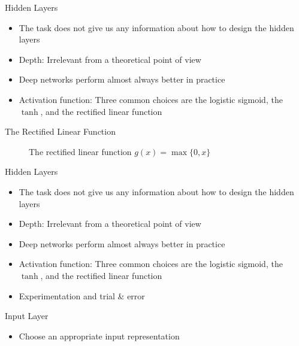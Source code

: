 \documentclass{beamer}
\begin{document}
	\begin{frame}{Hidden Layers}
		\begin{itemize}
			\item <1-> The task does not give us any information about how to design the hidden layers
			\item <2-> Depth: Irrelevant from a theoretical point of view
			\item <3-> Deep networks perform almost always better in practice
			\item <4-> Activation function: Three common choices are the logistic sigmoid, the $\tanh$, and the rectified linear function
		\end{itemize}
	\end{frame}
	\begin{frame}{The Rectified Linear Function}
		\begin{figure}
			\begin{center}
				
			\end{center}
			\caption{The rectified linear function $g(x) = \max\{0,x\}$}
			\label{fig:sigmoid}
		\end{figure}
	\end{frame}
	\begin{frame}{Hidden Layers}
		\begin{itemize}
			\item <1-> The task does not give us any information about how to design the hidden layers
			\item <1-> Depth: Irrelevant from a theoretical point of view
			\item <1-> Deep networks perform almost always better in practice
			\item <1-> Activation function: Three common choices are the logistic sigmoid, the $\tanh$, and the rectified linear function
			\item <1-> Experimentation and trial \& error
		\end{itemize}
	\end{frame}
	\begin{frame}{Input Layer}
		\begin{itemize}
			\item <1-> Choose an appropriate input representation
		\end{itemize}
	\end{frame}
\end{document}
